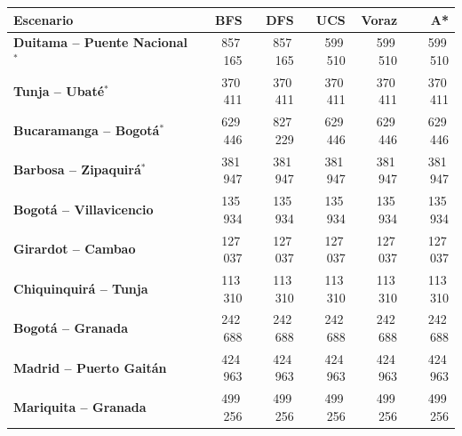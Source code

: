 \renewcommand{\arraystretch}{1.2}
\begin{tabular}{|l|r|r|r|r|r|}
\hline
\rowcolor{gray!20} \textbf{Escenario} & \textbf{BFS} & \textbf{DFS} & \textbf{UCS} & \textbf{Voraz} & \textbf{A*} \\
\hline
\textbf{Duitama -- Puente Nacional$^{*}$} & 857\,165 & 857\,165 & 599\,510 & 599\,510 & 599\,510 \\
\hline
\textbf{Tunja -- Ubaté$^{*}$} & 370\,411 & 370\,411 & 370\,411 & 370\,411 & 370\,411 \\
\hline
\textbf{Bucaramanga -- Bogotá$^{*}$} & 629\,446 & 827\,229 & 629\,446 & 629\,446 & 629\,446 \\
\hline
\textbf{Barbosa -- Zipaquirá$^{*}$} & 381\,947 & 381\,947 & 381\,947 & 381\,947 & 381\,947 \\
\hline
\textbf{Bogotá -- Villavicencio} & 135\,934 & 135\,934 & 135\,934 & 135\,934 & 135\,934 \\
\hline
\textbf{Girardot -- Cambao} & 127\,037 & 127\,037 & 127\,037 & 127\,037 & 127\,037 \\
\hline
\textbf{Chiquinquirá -- Tunja} & 113\,310 & 113\,310 & 113\,310 & 113\,310 & 113\,310 \\
\hline
\textbf{Bogotá -- Granada} & 242\,688 & 242\,688 & 242\,688 & 242\,688 & 242\,688 \\
\hline
\textbf{Madrid -- Puerto Gaitán} & 424\,963 & 424\,963 & 424\,963 & 424\,963 & 424\,963 \\
\hline
\textbf{Mariquita -- Granada} & 499\,256 & 499\,256 & 499\,256 & 499\,256 & 499\,256 \\
\hline
\end{tabular}
